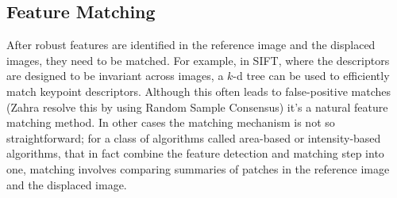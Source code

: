 \subsection{Feature Matching}

After robust features are identified in the reference image and the displaced images, they need to be matched.
%
For example, in SIFT, where the descriptors are designed to be invariant across images, a \(k\)-d tree can be used to efficiently match keypoint descriptors.
%
Although this often leads to false-positive matches (Zahra \etal resolve this by using Random Sample Consensus) it's a natural feature matching method.
%
In other cases the matching mechanism is not so straightforward; for a class of algorithms called area-based or intensity-based algorithms, that in fact combine the feature detection and matching step into one, matching involves comparing summaries of patches in the reference image and the displaced image.

